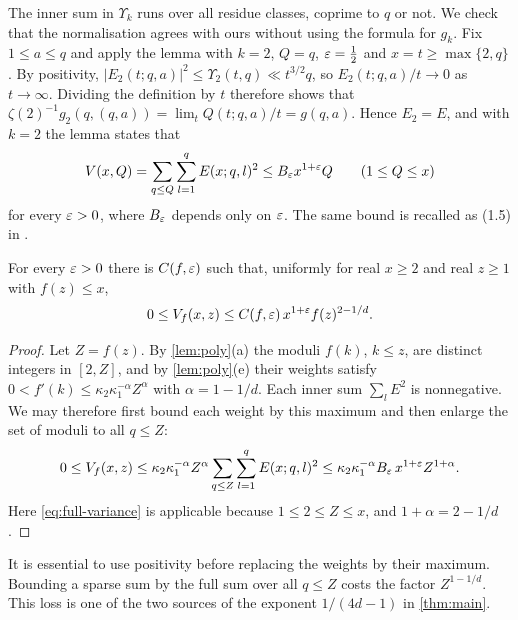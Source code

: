 The inner sum in $\Upsilon_k$ runs over all residue classes, coprime to $q$ or not. We check that the normalisation agrees with ours without using the formula for $g_k$. Fix $1\le a\le q$ and apply the lemma with $k=2$, $Q=q$, $\varepsilon=\frac12$ and $x=t\ge\max\{2,q\}$. By positivity, $|E_2(t;q,a)|^2\le\Upsilon_2(t,q)\ll t^{3/2}q$, so $E_2(t;q,a)/t\to0$ as $t\to\infty$. Dividing the definition by $t$ therefore shows that $\zeta(2)^{-1}g_2(q,(q,a))=\lim_tQ(t;q,a)/t=g(q,a)$. Hence $E_2=E$, and with $k=2$ the lemma states that
\begin{equation}\label{eq:full-variance}
V(x,Q)=\sum_{q\le Q}\sum_{l=1}^qE(x;q,l)^2\le B_\varepsilon x^{1+\varepsilon}Q\qquad(1\le Q\le x)
\end{equation}
for every $\varepsilon>0$, where $B_\varepsilon$ depends only on $\varepsilon$. The same bound is recalled as (1.5) in \cite{vaughan2005}.

\begin{proposition}\label{prop:initial}
For every $\varepsilon>0$ there is $C(f,\varepsilon)$ such that, uniformly for real $x\ge2$ and real $z\ge1$ with $f(z)\le x$,
\[
0\le V_f(x,z)\le C(f,\varepsilon)\,x^{1+\varepsilon}f(z)^{2-1/d}.
\]
\end{proposition}

\begin{proof}
Let $Z=f(z)$. By \cref{lem:poly}(a) the moduli $f(k)$, $k\le z$, are distinct integers in $[2,Z]$, and by \cref{lem:poly}(e) their weights satisfy $0<f'(k)\le\kappa_2\kappa_1^{-\alpha}Z^\alpha$ with $\alpha=1-1/d$. Each inner sum $\sum_lE^2$ is nonnegative. We may therefore first bound each weight by this maximum and then enlarge the set of moduli to all $q\le Z$:
\[
0\le V_f(x,z)\le\kappa_2\kappa_1^{-\alpha}Z^{\alpha}\sum_{q\le Z}\sum_{l=1}^qE(x;q,l)^2\le\kappa_2\kappa_1^{-\alpha}B_\varepsilon\,x^{1+\varepsilon}Z^{1+\alpha}.
\]
Here \eqref{eq:full-variance} is applicable because $1\le2\le Z\le x$, and $1+\alpha=2-1/d$.
\end{proof}

\begin{remark}
It is essential to use positivity before replacing the weights by their maximum. Bounding a sparse sum by the full sum over all $q\le Z$ costs the factor $Z^{1-1/d}$. This loss is one of the two sources of the exponent $1/(4d-1)$ in \cref{thm:main}.
\end{remark}
